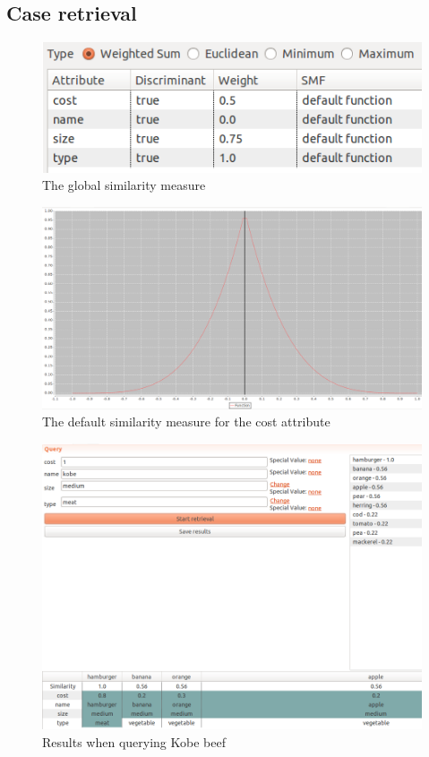 \documentclass{article}
\begin{document}
\subsection{Case retrieval}
\begin{figure}[H]
  \centering
    \includegraphics[width=1.0\textwidth]{global-similarity-measure.png}
    \caption{The global similarity measure}
    \label{fig:global-similarity}
\end{figure}

\begin{figure}[H]
  \centering
    \includegraphics[width=1.0\textwidth]{cost-similarity-measure.png}
    \caption{The default similarity measure for the cost attribute}
    \label{fig:cost-similarity}
\end{figure}

\begin{figure}[H]
  \centering
    \includegraphics[width=1.0\textwidth]{kobe-search.png}
    \caption{Results when querying Kobe beef}
    \label{fig:kobe-search}
\end{figure}
\end{document}
